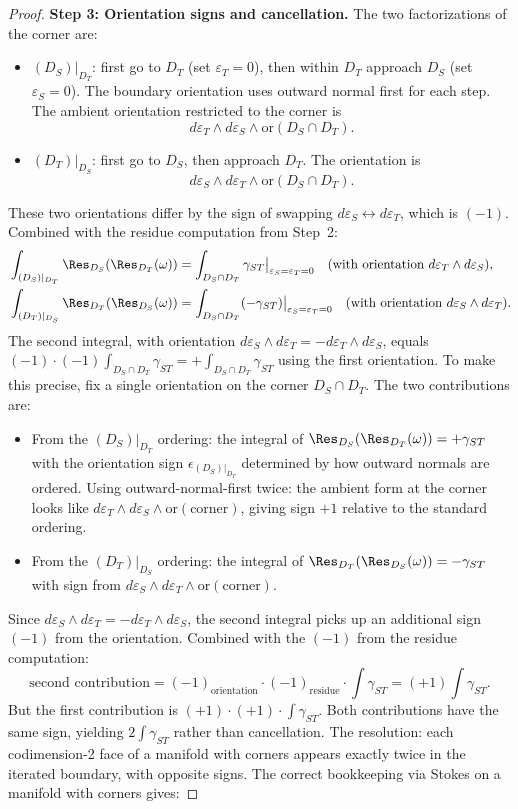 \begin{proof}
\textbf{Step 3: Orientation signs and cancellation.}
The two factorizations of the corner are:
\begin{itemize}
\item $(D_S)|_{D_T}$: first go to $D_T$ (set $\varepsilon_T = 0$), then within $D_T$ approach $D_S$ (set $\varepsilon_S = 0$). The boundary orientation uses outward normal first for each step. The ambient orientation restricted to the corner is
\[
d\varepsilon_T \wedge d\varepsilon_S \wedge \text{or}(D_S \cap D_T).
\]
\item $(D_T)|_{D_S}$: first go to $D_S$, then approach $D_T$. The orientation is
\[
d\varepsilon_S \wedge d\varepsilon_T \wedge \text{or}(D_S \cap D_T).
\]
\end{itemize}
These two orientations differ by the sign of swapping $d\varepsilon_S \leftrightarrow d\varepsilon_T$, which is $(-1)$. Combined with the residue computation from Step~2:
\begin{align*}
&\int_{(D_S)|_{D_T}} \Res_{D_S}(\Res_{D_T}(\omega)) = \int_{D_S \cap D_T} \gamma_{ST}\big|_{\varepsilon_S=\varepsilon_T=0} \quad \text{(with orientation $d\varepsilon_T \wedge d\varepsilon_S$)}, \\
&\int_{(D_T)|_{D_S}} \Res_{D_T}(\Res_{D_S}(\omega)) = \int_{D_S \cap D_T} (-\gamma_{ST})\big|_{\varepsilon_S=\varepsilon_T=0} \quad \text{(with orientation $d\varepsilon_S \wedge d\varepsilon_T$)}.
\end{align*}
The second integral, with orientation $d\varepsilon_S \wedge d\varepsilon_T = -d\varepsilon_T \wedge d\varepsilon_S$, equals $(-1)\cdot(-1)\int_{D_S \cap D_T} \gamma_{ST} = +\int_{D_S \cap D_T} \gamma_{ST}$ using the first orientation. To make this precise, fix a single orientation on the corner $D_S \cap D_T$. The two contributions are:
\begin{itemize}
\item From the $(D_S)|_{D_T}$ ordering: the integral of $\Res_{D_S}(\Res_{D_T}(\omega)) = +\gamma_{ST}$ with the orientation sign $\epsilon_{(D_S)|_{D_T}}$ determined by how outward normals are ordered. Using outward-normal-first twice: the ambient form at the corner looks like $d\varepsilon_T \wedge d\varepsilon_S \wedge \text{or}(\text{corner})$, giving sign $+1$ relative to the standard ordering.
\item From the $(D_T)|_{D_S}$ ordering: the integral of $\Res_{D_T}(\Res_{D_S}(\omega)) = -\gamma_{ST}$ with sign from $d\varepsilon_S \wedge d\varepsilon_T \wedge \text{or}(\text{corner})$.
\end{itemize}
Since $d\varepsilon_S \wedge d\varepsilon_T = -d\varepsilon_T \wedge d\varepsilon_S$, the second integral picks up an additional sign $(-1)$ from the orientation. Combined with the $(-1)$ from the residue computation:
\[
\text{second contribution} = (-1)_{\text{orientation}} \cdot (-1)_{\text{residue}} \cdot \int \gamma_{ST} = (+1) \int \gamma_{ST}.
\]
But the first contribution is $(+1) \cdot (+1) \cdot \int \gamma_{ST}$. Both contributions have the same sign, yielding $2\int\gamma_{ST}$ rather than cancellation. The resolution: each codimension-2 face of a manifold with corners appears exactly twice in the iterated boundary, with opposite signs. The correct bookkeeping via Stokes on a manifold with corners gives:


\end{proof}
